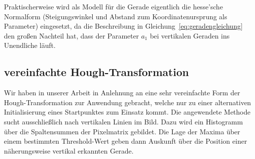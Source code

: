 Praktischerweise wird als Modell für die Gerade eigentlich die hesse'sche Normalform (Steigungswinkel und Abstand zum Koordinatenursprung als Parameter) eingesetzt, da die Beschreibung in Gleichung~\ref{eq:geradengleichung} den großen Nachteil hat, dass der Parameter \( a_1 \) bei vertikalen Geraden ins Unendliche läuft. 

\subsection{vereinfachte Hough-Transformation}
Wir haben in unserer Arbeit in Anlehnung an \autocite{alyRealTimeDetection2008} eine sehr vereinfachte Form der Hough-Transformation zur Anwendung gebracht, welche nur zu einer alternativen Initialisierung eines Startpunktes zum Einsatz kommt. Die angewendete Methode sucht ausschließlich nach vertikalen Linien im Bild. Dazu wird ein Histogramm über die Spaltensummen der Pixelmatrix gebildet. Die Lage der Maxima über einem bestimmten Threshold-Wert geben dann Auskunft über die Position einer näherungsweise vertikal erkannten Gerade.